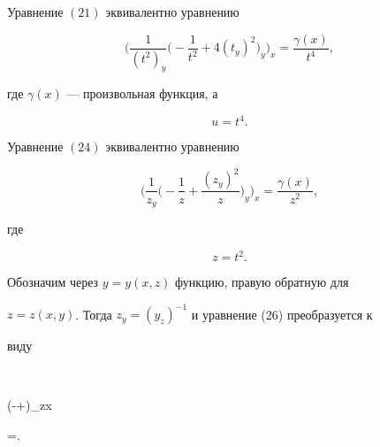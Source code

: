 \begin{lem} 


Уравнение $(21)$ эквивалентно уравнению 


\begin{equation} 


\bigg(\frac{1}{(t^2)_y}\bigg(-\frac{1}{t^2}+4(t_y)^2 


\bigg)_y\bigg)_x=\frac{\gamma(x)}{t^4}, 


\end{equation} 


где $\gamma(x)$ --- произвольная функция, а 


\begin{equation} 


u=t^4. 


\end{equation} 


\end{lem} 


 


\begin{lem} 


Уравнение $(24)$ эквивалентно уравнению 


\begin{equation} 


\bigg(\frac{1}{z_y}\bigg(-\frac{1}{z}+\frac{(z_y)^2}{z} 


\bigg)_y\bigg)_x=\frac{\gamma(x)}{z^2}, 


\end{equation} 


где 


\begin{equation} 


z=t^2. 


\end{equation} 


\end{lem} 


 


 


Обозначим через $y=y(x,z)$ функцию, правую обратную для 


$z=z(x,y)$. Тогда $z_y=(y_z)^{-1}$ и уравнение (26) преобразуется к 


виду 


$$ 


\bigg(-+\bigg)_{zx} 


=. 


